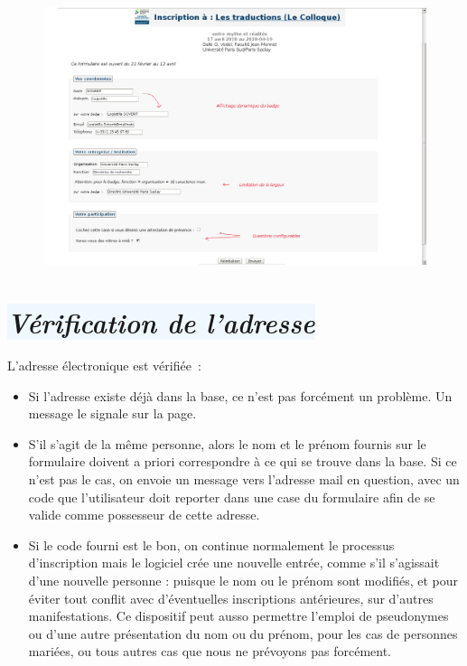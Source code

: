 \documentclass[10pt,a4paper]{article}
\newcommand{\bleupale}[1]{\colorbox{AliceBlue}{#1}}
\begin{document}
\begin{figure}[h]
  \includegraphics[width=500px]{images/formulaire-inscription-2}
\end{figure}

\newpage
\section*{\bleupale{\emph{Vérification de l'adresse}}}

L'adresse électronique est vérifiée :
\begin{itemize}
  \item Si l'adresse existe déjà dans la base, ce n'est pas forcément un problème. Un message le signale sur la page.
  \item S'il s'agit de la même personne, alors le nom et le prénom fournis sur le formulaire doivent a priori correspondre à ce qui se trouve dans la base. Si ce n'est pas le cas, on envoie un message vers l'adresse mail en question, avec un code que l'utilisateur doit reporter dans une case du formulaire afin de se valide comme possesseur de cette adresse.
  \item Si le code fourni est le bon, on continue normalement le processus d'inscription mais le logiciel crée une nouvelle entrée, comme s'il s'agissait d'une nouvelle personne : puisque le nom ou le prénom sont modifiés, et pour éviter tout conflit avec d'éventuelles inscriptions antérieures, sur d'autres manifestations. Ce dispositif peut ausso permettre l'emploi de pseudonymes ou d'une autre présentation du nom ou du prénom, pour les cas de personnes mariées, ou tous autres cas que nous ne prévoyons pas forcément.
  \end{itemize}
\end{document}
